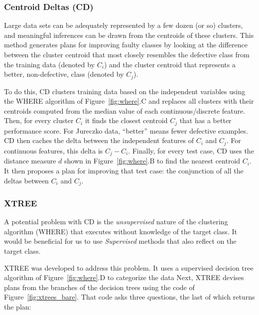 \documentclass{sig-alternate}
\newcommand{\fig}[1]{Figure~\ref{fig:#1}}
\begin{document}
\subsubsection{Centroid Deltas (CD)}


Large data sets can be adequately represented by a few dozen (or so) clusters, and meaningful inferences can be drawn from the centroids of these clusters. This method generates plans for improving faulty classes by looking at the difference between the cluster centroid that most closely resembles the defective class from the training data (denoted by $C_i$) and the cluster centroid that represents a better, non-defective, class (denoted by $C_j$).
 
To do this, CD clusters training data based on the independent variables using the WHERE algorithm of \fig{where}.C and replaces all clusters with their centroids computed from the median value of each continuous/discrete feature. Then, for every cluster $C_i$ it finds the closest centroid $C_j$ that has a better performance score. For Jureczko data, ``better'' means fewer defective examples. CD then caches the delta between the independent features of $C_i$ and $C_j$. For continuous features, this delta is $C_j - C_i$. Finally, for every test case, CD uses the distance measure $d$ shown in \fig{where}.B to find the nearest centroid $C_i$.  It then proposes a plan for improving that test case: the conjunction of all the deltas between $C_i$ and $C_j$.




\subsubsection{XTREE}

A potential problem with CD is the {\em unsupervised} nature of the clustering algorithm (WHERE) that executes without knowledge of the target class. It would be beneficial for us to use {\em Supervised} methods that also reflect on the target class.

XTREE was developed to address this problem. It uses a supervised decision tree algorithm of \fig{where}.D to categorize the data Next, XTREE devises plans from the branches of the decision trees using the code of \fig{xtrees_bare}. That code asks three questions, the last of which returns the plan:
\end{document}
